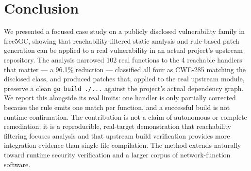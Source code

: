 \documentclass[sigconf]{acmart}
\begin{document}
\section{Conclusion}

We presented a focused case study on a publicly disclosed vulnerability family in
free5GC, showing that reachability-filtered static analysis and rule-based patch
generation can be applied to a real vulnerability in an actual project's upstream
repository. The analysis narrowed 102 real functions to the 4 reachable handlers
that matter --- a 96.1\% reduction --- classified all four as CWE-285 matching
the disclosed class, and produced patches that, applied to the real upstream
module, preserve a clean \texttt{go build ./...} against the project's actual
dependency graph. We report this alongside its real limits: one handler is only
partially corrected because the rule emits one match per function, and a
successful build is not runtime confirmation. The contribution is not a claim of
autonomous or complete remediation; it is a reproducible, real-target
demonstration that reachability filtering focuses analysis and that upstream
build verification provides more integration evidence than single-file
compilation. The method extends naturally toward runtime security verification
and a larger corpus of network-function software.
\end{document}
